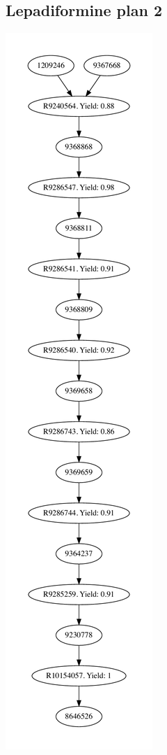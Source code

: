 \documentclass[a4paper,10pt,titlepage]{paper}
\begin{document}
\subsection{Lepadiformine plan 2}
\centering
\includegraphics[scale=0.4]{Synteseplaner/Lepadiformine/plan2.pdf}
\label{Appendix::Lepadiformine2}
\end{document}

